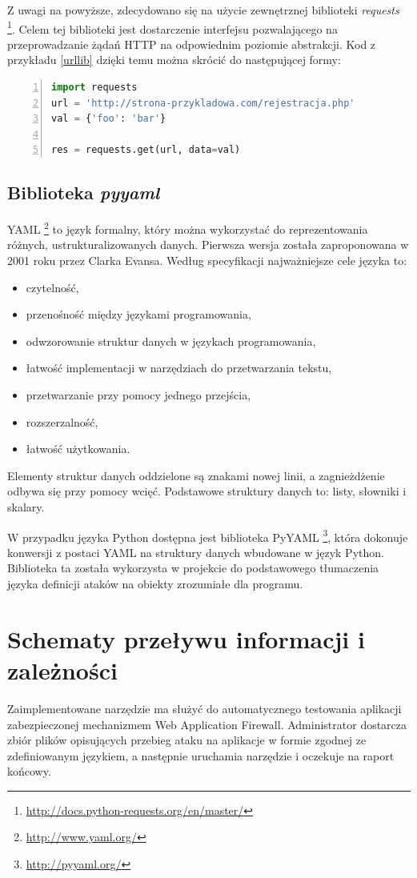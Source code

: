 \documentclass[11pt,a4paper,polish,thesis,oneside]{dcsbook}
\begin{document}
Z uwagi na powyższe, zdecydowano się na użycie zewnętrznej biblioteki \textit{requests} \footnote{\url{http://docs.python-requests.org/en/master/}}. Celem tej biblioteki jest dostarczenie interfejsu pozwalającego na przeprowadzanie żądań HTTP na odpowiednim poziomie abstrakcji. Kod z przykładu \ref{urllib} dzięki temu można skrócić do następującej formy:
\begin{lstlisting}[language=python,frame=single,label=req1,numbers=left]
import requests
url = 'http://strona-przykladowa.com/rejestracja.php'
val = {'foo': 'bar'}

res = requests.get(url, data=val)
\end{lstlisting}

\subsection{Biblioteka \textit{pyyaml}}
YAML \footnote{\url{http://www.yaml.org/}} to język formalny, który można wykorzystać do reprezentowania różnych, ustrukturalizowanych danych. Pierwsza wersja została zaproponowana w 2001 roku przez Clarka Evansa. Według specyfikacji \cite{yamlspec} najważniejsze cele języka to: 
\begin{itemize}
\item czytelność,
\item przenośność między językami programowania,
\item odwzorowanie struktur danych w językach programowania,
\item łatwość implementacji w narzędziach do przetwarzania tekstu,
\item przetwarzanie przy pomocy jednego przejścia,
\item rozszerzalność,
\item łatwość użytkowania.
\end{itemize}

Elementy struktur danych oddzielone są znakami nowej linii, a zagnieżdżenie odbywa się przy pomocy wcięć. Podstawowe struktury danych to: listy, słowniki i skalary.

W przypadku języka Python dostępna jest biblioteka PyYAML \footnote{\url{http://pyyaml.org/}}, która dokonuje konwersji z postaci YAML na struktury danych wbudowane w język Python. Biblioteka ta została wykorzysta w projekcie do podstawowego tłumaczenia języka definicji ataków na obiekty zrozumiałe dla programu.

\section{Schematy przeływu informacji i zależności}
Zaimplementowane narzędzie ma służyć do automatycznego testowania aplikacji zabezpieczonej mechanizmem Web Application Firewall. Administrator dostarcza zbiór plików opisujących przebieg ataku na aplikacje w formie zgodnej ze zdefiniowanym językiem, a następnie uruchamia narzędzie i oczekuje na raport końcowy.
\end{document}
